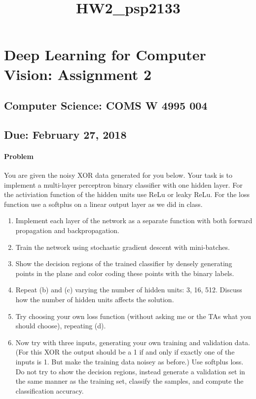 \documentclass[11pt]{article}
\title{HW2\_psp2133}
\begin{document}
    
    
    \maketitle
    
    

    
    \section{Deep Learning for Computer Vision: Assignment
2}\label{deep-learning-for-computer-vision-assignment-2}

    \subsection{Computer Science: COMS W 4995
004}\label{computer-science-coms-w-4995-004}

    \subsection{Due: February 27, 2018}\label{due-february-27-2018}

    \paragraph{Problem}\label{problem}

    You are given the noisy XOR data generated for you below. Your task is
to implement a multi-layer perceptron binary classifier with one hidden
layer. For the activiation function of the hidden units use ReLu or
leaky ReLu. For the loss function use a softplus on a linear output
layer as we did in class.

\begin{enumerate}
\def\labelenumi{\alph{enumi})}
\item
  Implement each layer of the network as a separate function with both
  forward propagation and backpropagation.
\item
  Train the network using stochastic gradient descent with mini-batches.
\item
  Show the decision regions of the trained classifier by densely
  generating points in the plane and color coding these points with the
  binary labels.
\item
  Repeat (b) and (c) varying the number of hidden units: 3, 16, 512.
  Discuss how the number of hidden units affects the solution.
\item
  Try choosing your own loss function (without asking me or the TAs what
  you should choose), repeating (d).
\item
  Now try with three inputs, generating your own training and validation
  data. (For this XOR the output should be a 1 if and only if exactly
  one of the inputs is 1. But make the training data noisey as before.)
  Use softplus loss. Do not try to show the decision regions, instead
  generate a validation set in the same manner as the training set,
  classify the samples, and compute the classification accuracy.
\end{enumerate}
\end{document}
